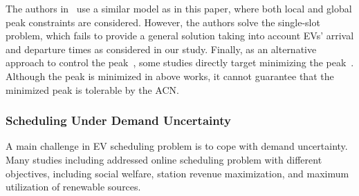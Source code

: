 The authors in~\cite{malhotra2017distributed} use a similar model as in this paper, where both local and global peak constraints are considered. However, the authors solve the single-slot problem, which fails to provide a general solution taking into account EVs' arrival and departure times as considered in our study.
Finally, as an alternative approach to control the peak~\cite{Zhang2015eEnergy,lee2019learning}, some studies directly target minimizing the peak~\cite{Zhao}. 
Although the peak is minimized in above works, it cannot guarantee that the minimized peak is tolerable by the ACN.


\subsubsection{Scheduling Under Demand Uncertainty}
A main challenge in EV scheduling problem is to cope with demand uncertainty. Many studies including \cite{Shroff2014,Tang,WTang,Chen,Xiang,Zhao,Robu,Hajiesmaili2016Online,hajiesmaili2017crowd} addressed online scheduling problem with different objectives, including social welfare, station revenue maximization, and maximum utilization of renewable sources. 


